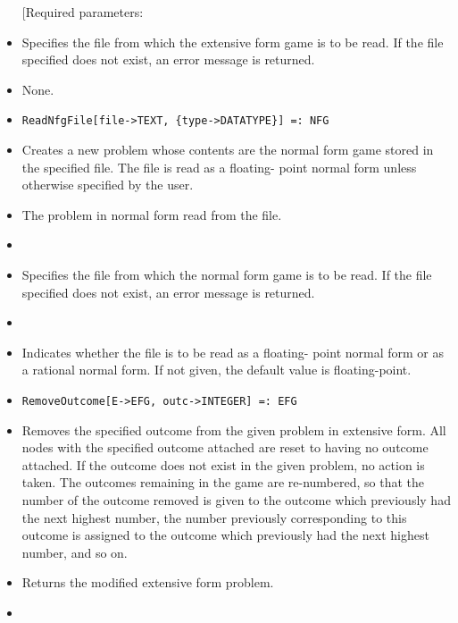 \begin{itemize}
[Required parameters:

\bd
\item
[ file:] Specifies the file from which the extensive form game is to
be read.  If the file specified does not exist, an error 
message is returned.
\ed

\item
[Optional parameters:] None.
\ed

\item
\protect \large \begin{verbatim}
ReadNfgFile[file->TEXT, {type->DATATYPE}] =: NFG
\end{verbatim}\normalsize

\bd
\item
[Description:] Creates a new problem whose contents are the normal form
game stored in the specified file.  The file is read as a floating-
point normal form unless otherwise specified by the user.
\item
[Return value:] The problem in normal form read from the file.
\item
[Required parameters:]\hfil\null

\bd
\item
[ file:] Specifies the file from which the normal form game is to be
read.  If the file specified does not exist, an error message
is returned.
\ed

\item
[Optional parameters:]\hfil\null
	

\bd
\item
[ type:] Indicates whether the file is to be read as a floating-
point normal form or as a rational normal form.  If not given,
the default value is floating-point.
\ed
\ed

\item

\protect \large \begin{verbatim}
RemoveOutcome[E->EFG, outc->INTEGER] =: EFG
\end{verbatim}\normalsize

\bd
\item
[Description:] Removes the specified outcome from the given problem in
extensive form.  All nodes with the specified outcome attached are 
reset to having no outcome attached.  If the outcome does not exist in
the given problem, no action is taken.  The outcomes remaining in the 
game are re-numbered, so that the number of the outcome removed is 
given to the outcome which previously had the next highest number, the
number previously corresponding to this outcome is assigned to the
outcome which previously had the next highest number, and so on.  
\item  
[Return value:] Returns the modified extensive form problem.
\item
[Required parameters:]\hfil\null
	

\end{itemize}
